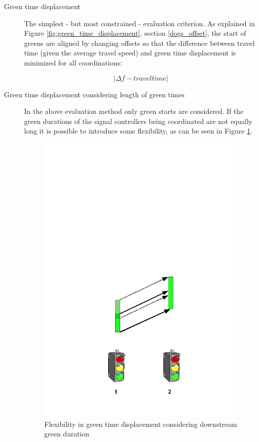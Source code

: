 \begin{description}
\item[Green time displacement]
The simplest - but most constrained - evaluation criterion. As explained in Figure \ref{fig:green_time_displacement}, section \ref{dogs_offset}, the start of greens are aligned by changing offsets so that the difference between travel time (given the average travel speed) and green time displacement is minimized for all coordinations:

$$|\Delta f - traveltime|$$

\item[Green time displacement considering length of green times]
In the above evaluation method only green starts are considered. If the green durations of the signal controllers being coordinated are not equally long it is possible to introduce some flexibility, as can be seen in Figure \ref{fig:green_time_displacement_flex}.

\begin{figure}[ht]
\begin{center}
\includegraphics[scale=0.4]{green_time_displacement_flex.png} 
\end{center}
\caption{Flexibility in green time displacement considering downstream green duration}
\label{fig:green_time_displacement_flex}
\end{figure}


\end{description}
